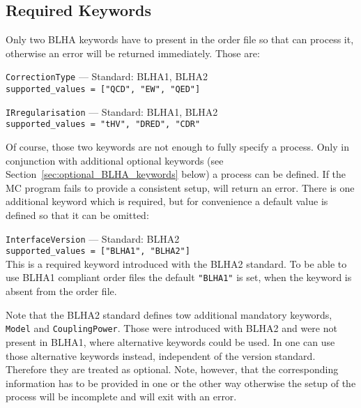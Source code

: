 \lstset{
  breaklines = true,
  breakatwhitespace = true
}

\subsection{Required Keywords}
Only two BLHA keywords have to present in the order file so that \gosam can process it, otherwise an error will be returned immediately. Those are:
\begin{basedescript}{\desclabelstyle{\pushlabel}}
    \item[\hspace{-1em}]\colorbox{gray!30}{\lstinline[style=in]|CorrectionType|} --- Standard: BLHA1, BLHA2\vspace{0.1cm}\\
        \lstinline[style=in]|supported_values = ["QCD", "EW", "QED"]|
    \item[\hspace{-1em}]\colorbox{gray!30}{\lstinline[style=in]|IRregularisation|} --- Standard: BLHA1, BLHA2\vspace{0.1cm}\\
        \lstinline[style=in]|supported_values = "tHV", "DRED", "CDR"|
\end{basedescript}
Of course, those two keywords are not enough to fully specify a process. Only in conjunction with additional optional keywords (see Section~\ref{sec:optional_BLHA_keywords} below) a process can be defined. If the MC program fails to provide a consistent setup, \gosam will return an error. There is one additional keyword which is required, but for convenience a default value is defined so that it can be omitted:
\begin{basedescript}{\desclabelstyle{\pushlabel}}
    \item[\hspace{-1em}]\colorbox{gray!30}{\lstinline[style=in]|InterfaceVersion|} --- Standard: BLHA2\vspace{0.1cm}\\
        \lstinline[style=in]|supported_values = ["BLHA1", "BLHA2"]|\\
        This is a required keyword introduced with the BLHA2 standard. To be able to use BLHA1 compliant order files the default \texttt{"BLHA1"} is set, when the keyword is absent from the order file.
\end{basedescript}
Note that the BLHA2 standard defines tow additional mandatory keywords, \texttt{Model} and \texttt{CouplingPower}. Those were introduced with BLHA2 and were not present in BLHA1, where alternative keywords could be used. In \gosam one can use those alternative keywords instead, independent of the version standard. Therefore they are treated as optional. Note, however, that the corresponding information has to be provided in one or the other way otherwise the setup of the process will be incomplete and \gosam will exit with an error.

